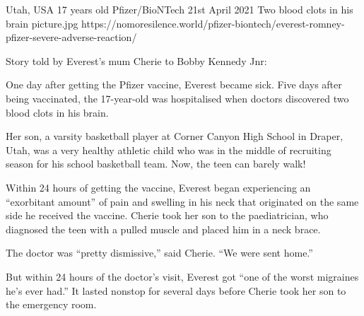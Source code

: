 {Utah, USA}
{17 years old}
{Pfizer/BioNTech}
{21st April 2021}
{Two blood clots in his brain}
{picture.jpg}
{https://nomoresilence.world/pfizer-biontech/everest-romney-pfizer-severe-adverse-reaction/}
{

Story told by Everest’s mum Cherie to Bobby Kennedy Jnr:

One day after getting the Pfizer vaccine, Everest became sick. Five days after
being vaccinated, the 17-year-old was hospitalised when doctors discovered two
blood clots in his brain.

Her son, a varsity basketball player at Corner Canyon High School in Draper,
Utah, was a very healthy athletic child who was in the middle of recruiting
season for his school basketball team. Now, the teen can barely walk!

Within 24 hours of getting the vaccine, Everest began experiencing an
“exorbitant amount” of pain and swelling in his neck that originated on the same
side he received the vaccine. Cherie took her son to the paediatrician, who
diagnosed the teen with a pulled muscle and placed him in a neck brace.

The doctor was “pretty dismissive,” said Cherie. “We were sent home.”

But within 24 hours of the doctor’s visit, Everest got “one of the worst
migraines he’s ever had.” It lasted nonstop for several days before Cherie took
her son to the emergency room.

}
